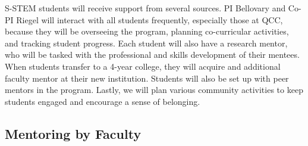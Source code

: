 \documentclass[12pt]{article}
\begin{document}


S-STEM students will receive support from several sources.  PI Bellovary and Co-PI Riegel will interact with all students frequently, especially those at QCC, because they will be overseeing the program, planning co-curricular activities, and tracking student progress.  Each student will also have a research mentor, who will be tasked with the professional and skills development of their mentees.  When students transfer to a 4-year college, they will acquire and additional faculty mentor at their new institution.  Students will also be set up with peer mentors in the program.  Lastly, we will plan various community activities to keep students engaged and encourage a sense of belonging.
\vspace{-5mm}

\subsection{\normalsize{Mentoring by Faculty}}
\vspace{-2mm}
\end{document}
